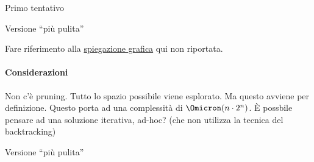 \begin{minipage}[t]{.5\linewidth}
	\begin{algorithm}[H]
	\caption{Primo tentativo}


	\end{algorithm}
\end{minipage}
\begin{minipage}[t]{.5\linewidth}
	\begin{algorithm}[H]
	\caption{Versione \enquote{più pulita}}


	\end{algorithm}
\end{minipage}

Fare riferimento alla \href{https://youtu.be/00hO1skHCls?t=1420}{spiegazione grafica} qui non riportata.

\paragraph{Considerazioni}
Non c'è pruning.
Tutto lo spazio possibile viene esplorato.
Ma questo avviene per definizione.
Questo porta ad una complessità di \(\Omicron(n \cdot 2^n)\).
\`{E} possbile pensare ad una soluzione iterativa, ad-hoc? (che non utilizza la tecnica del backtracking)

\begin{algorithm}[H]
\caption{Versione \enquote{più pulita}}


\end{algorithm}

